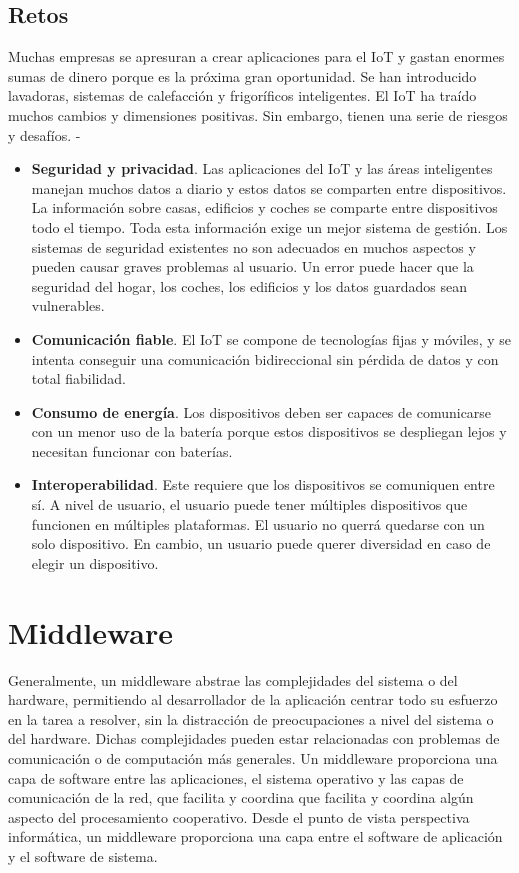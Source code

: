 {\subsection{Retos}

Muchas empresas se apresuran a crear aplicaciones para el IoT y gastan enormes sumas de dinero porque es la próxima gran oportunidad. Se han introducido lavadoras, sistemas de calefacción y frigoríficos inteligentes. El IoT ha traído muchos cambios y dimensiones positivas. Sin embargo, tienen una serie de riesgos y desafíos. \cite{8320780}-\cite{tripathy2017internet}

\begin{itemize}
    \item \textbf{Seguridad y privacidad}. Las aplicaciones del IoT y las áreas inteligentes manejan muchos datos a diario y estos datos se comparten entre dispositivos. La información sobre casas, edificios y coches se comparte entre dispositivos todo el tiempo. Toda esta información exige un mejor sistema de gestión. Los sistemas de seguridad existentes no son adecuados en muchos aspectos y pueden causar graves problemas al usuario. Un error puede hacer que la seguridad del hogar, los coches, los edificios y los datos guardados sean vulnerables.
    \item \textbf{Comunicación fiable}. El IoT se compone de tecnologías fijas y móviles, y se intenta conseguir una comunicación bidireccional sin pérdida de datos y con total fiabilidad.
    \item \textbf{Consumo de energía}. Los dispositivos deben ser capaces de comunicarse con un menor uso de la batería porque estos dispositivos se despliegan lejos y necesitan funcionar con baterías.
    \item \textbf{Interoperabilidad}. Este requiere que los dispositivos se comuniquen entre sí. A nivel de usuario, el usuario puede tener múltiples dispositivos que funcionen en múltiples plataformas. El usuario no querrá quedarse con un solo dispositivo. En cambio, un usuario puede querer diversidad en caso de elegir un dispositivo.
\end{itemize}


\section{Middleware} \label{sec:middleware}

Generalmente, un middleware abstrae las complejidades del sistema o del hardware, permitiendo al desarrollador de la aplicación centrar todo su esfuerzo en la tarea a resolver, sin la distracción de preocupaciones a nivel del sistema o del hardware. Dichas complejidades pueden estar relacionadas con problemas de comunicación o de computación más generales. Un middleware proporciona una capa de software entre las aplicaciones, el sistema operativo y las capas de comunicación de la red, que facilita y coordina que facilita y coordina algún aspecto del procesamiento cooperativo. Desde el punto de vista perspectiva informática, un middleware proporciona una capa entre el software de aplicación y el software de sistema.\\

}
